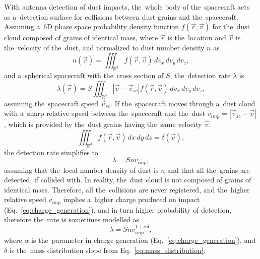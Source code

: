 With antenna detection of dust impacts, the~whole body of the~spacecraft acts as a~detection surface for collisions between dust grains and the~spacecraft. Assuming a~6D phase space probability density function $f(\vec{r},\vec{v})$ for the~dust cloud composed of grains of identical mass, where $\vec{r}$ is the~location and $\vec{v}$ is the~velocity of the~dust, and normalized to dust number density $n$ as
\begin{equation}
    n(\vec{r}) = \iiint_{\mathbb{R}^3} f(\vec{r},\vec{v}) \,dv_x\,dv_y\,dv_z,
\end{equation}
and a~spherical spacecraft with the~cross section of $S$, the~detection rate $\lambda$ is
\begin{equation}
    \lambda(\vec{r}) = S \iiint_{\mathbb{R}^3} |\vec{v}-\vec{v}_{sc}| f(\vec{r},\vec{v})  \,dv_x\,dv_y\,dv_z, \label{eq:phase_space_lambda}
\end{equation}
assuming the~spacecraft speed $\vec{v}_{sc}$. If the~spacecraft moves through a~dust cloud with a~sharp relative speed between the~spacecraft and the~dust $v_{imp}=|\vec{v}_{sc}-\vec{v}|$, which is provided by the~dust grains having the~same velocity $\vec{v}$:
\begin{equation}
    \iiint_{\mathbb{R}^3} f(\vec{r},\vec{v}) \,dx\,dy\,dz = \delta(\vec{v}),
\end{equation}
the detection rate simplifies to  
\begin{equation}
    \lambda = S n v_{imp},
\end{equation}
assuming that the~local number density of dust is $n$ and that all the~grains are detected, if collided with. In reality, the~dust cloud is not composed of grains of identical mass. Therefore, all the~collisions are never registered, and the~higher relative speed $v_{imp}$ implies a~higher charge produced on impact (Eq.~\ref{eq:charge_generation}), and in turn higher probability of detection, therefore the~rate is sometimes modelled as
\begin{equation}
    \lambda = S n v_{imp}^{1+\alpha \delta}, \label{eq:rate_semi_general}
\end{equation}
where $\alpha$ is the~parameter in charge generation (Eq.~\ref{eq:charge_generation}), and $\delta$ is the~mass distribution slope from Eq.~\ref{eq:mass_distribution}. 

